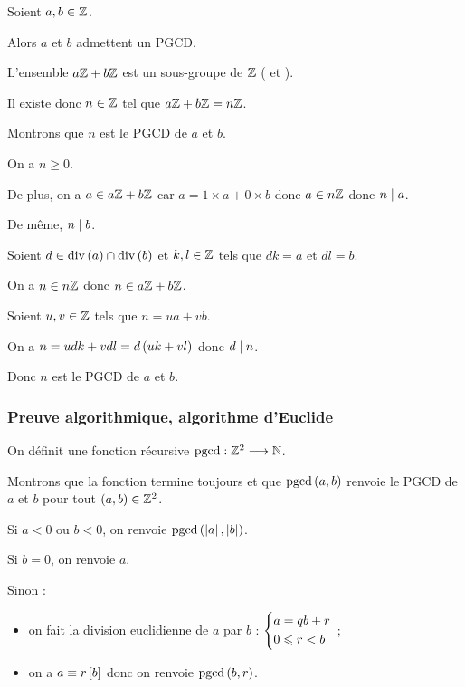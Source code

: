 \begin{prop}
Soient \(a,b\in\Z\).

Alors \(a\) et \(b\) admettent un PGCD.
\end{prop}

\begin{dem}
L'ensemble \(a\Z+b\Z\) est un sous-groupe de \(\Z\) (\cf {} et ).

Il existe donc \(n\in\Z\) tel que \(a\Z+b\Z=n\Z\).

Montrons que \(n\) est le PGCD de \(a\) et \(b\).

On a \(n\geq0\).

De plus, on a \(a\in a\Z+b\Z\) car \(a=1\times a+0\times b\) donc \(a\in n\Z\) donc \(n\divise a\).

De même, \(n\divise b\).

Soient \(d\in\ensdiv{a}\inter\ensdiv{b}\) et \(k,l\in\Z\) tels que \(dk=a\) et \(dl=b\).

On a \(n\in n\Z\) donc \(n\in a\Z+b\Z\).

Soient \(u,v\in\Z\) tels que \(n=ua+vb\).

On a \(n=udk+vdl=d\paren{uk+vl}\) donc \(d\divise n\).

Donc \(n\) est le PGCD de \(a\) et \(b\).
\end{dem}

\subsubsection{Preuve algorithmique, algorithme d'Euclide}

On définit une fonction récursive \(\pgcd:\Z^2\to\N\).

Montrons que la fonction termine toujours et que \(\pgcd[a][b]\) renvoie le PGCD de \(a\) et \(b\) pour tout \(\paren{a,b}\in\Z^2\).

\begin{algo}
Si \(a<0\) ou \(b<0\), on renvoie \(\pgcd[\abs{a}][\abs{b}]\).

Si \(b=0\), on renvoie \(a\).

Sinon : \begin{itemize}
\item on fait la division euclidienne de \(a\) par \(b\) : \(\begin{dcases}a=qb+r \\ 0\leq r<b\end{dcases}\) ; \\

\item on a \(a\equiv r\croch{b}\) donc on renvoie \(\pgcd[b][r]\).
\end{itemize}
\end{algo}

